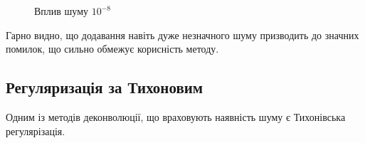 \documentclass{diploma}
\begin{document}
      \begin{figure}[htb]
        \hfill
        \hfill
        \caption{Вплив шуму $10^{-8}$}
        \label{fig:Lenna:10-8}
      \end{figure}
      Гарно видно, що додавання навіть дуже незначного шуму призводить до
      значних помилок, що сильно обмежує корисність методу.
      \clearpage
    \subsection{Регуляризація за Тихоновим}
      Одним із методів деконволюції, що враховують наявність шуму є
      Тихонівська регулярізація.
\end{document}
